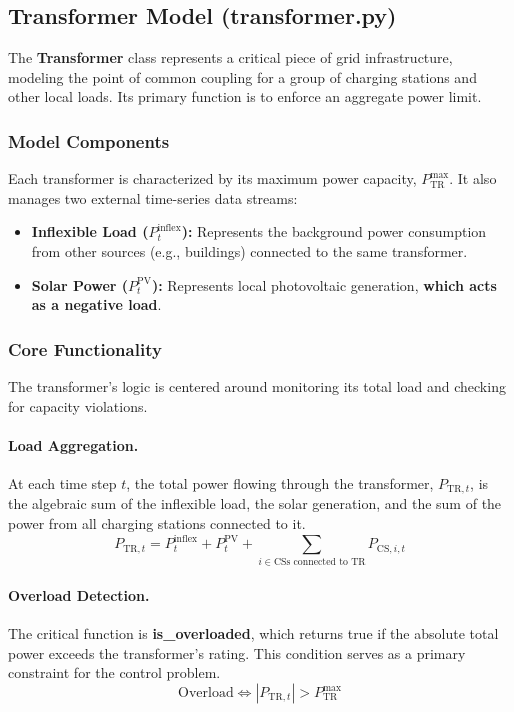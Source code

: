 \subsection{Transformer Model (\textbf{transformer.py})}
The \textbf{Transformer} class represents a critical piece of grid infrastructure, modeling the point of common coupling for a group of charging stations and other local loads. Its primary function is to enforce an aggregate power limit.

\subsubsection{Model Components}
Each transformer is characterized by its maximum power capacity, $P^{\text{max}}_{\text{TR}}$. It also manages two external time-series data streams:
\begin{itemize}
    \item \textbf{Inflexible Load ($P^{\text{inflex}}_{t}$):} Represents the background power consumption from other sources (e.g., buildings) connected to the same transformer.
    \item \textbf{Solar Power ($P^{\text{PV}}_{t}$):} Represents local photovoltaic generation, \textbf{which acts as a negative load}.
\end{itemize}

\subsubsection{Core Functionality}
The transformer's logic is centered around monitoring its total load and checking for capacity violations.
\noindent
\paragraph{Load Aggregation.} At each time step $t$, the total power flowing through the transformer, $P_{\text{TR},t}$, is the algebraic sum of the inflexible load, the solar generation, and the sum of the power from all charging stations connected to it.
\begin{equation}
    P_{\text{TR},t} = P^{\text{inflex}}_{t} + P^{\text{PV}}_{t} + \sum_{i \in \text{CSs connected to TR}} P_{\text{CS},i,t}
\end{equation}
\paragraph{Overload Detection.} The critical function is \textbf{is\_overloaded}, which returns true if the absolute total power exceeds the transformer's rating. This condition serves as a primary constraint for the control problem.
\begin{equation}
    \text{Overload} \iff |P_{\text{TR},t}| > P^{\text{max}}_{\text{TR}}
\end{equation}
